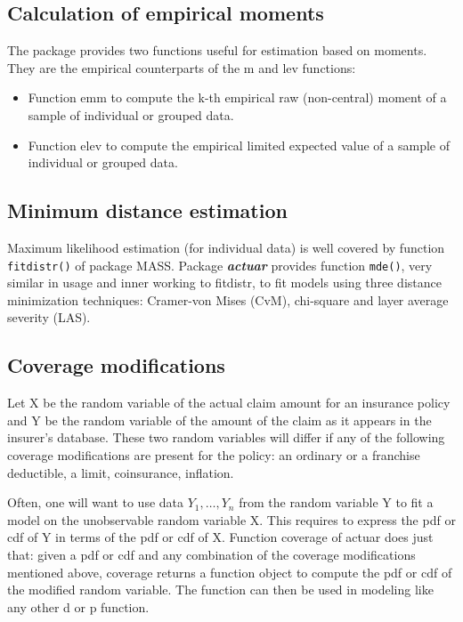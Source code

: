 \documentclass[12pt]{article}
\begin{document}
\subsection{Calculation of empirical moments}

The package provides two functions useful for estimation based on moments. They are the empirical counterparts of the m and lev functions:
\begin{itemize}
\item Function emm to compute the k-th empirical raw (non-central) moment of a sample of individual or grouped data.
\item Function elev to compute the empirical limited expected value of a sample of individual or grouped data.
\end{itemize}

\subsection{Minimum distance estimation}

Maximum likelihood estimation (for individual data) is well covered by function \texttt{fitdistr()} of package MASS. Package \textbf{\textit{actuar}} provides function \texttt{mde()}, very similar in usage and inner working to fitdistr, to fit models using three distance minimization techniques: Cramer-von Mises (CvM), chi-square and layer average severity (LAS).

\subsection{Coverage modifications}

Let X be the random variable of the actual claim amount for an insurance policy and Y be the random variable of the amount of the claim as it appears in the insurer's database. These two random variables will differ if any of the following coverage modifications are present for the policy: an ordinary or a franchise deductible, a limit, coinsurance, inflation. 

Often, one will want to use data $Y_1, \ldots, Y_n$ from the random variable Y to fit a model on the unobservable random variable X. This requires to express the pdf or cdf of Y in terms of the pdf or cdf of X. Function coverage of actuar does just that: given a pdf or cdf and any combination of the coverage modifications mentioned above, coverage returns a function object to compute the pdf or cdf of the modified random variable. The function can then be used in modeling like any other d or p function.
\end{document}
